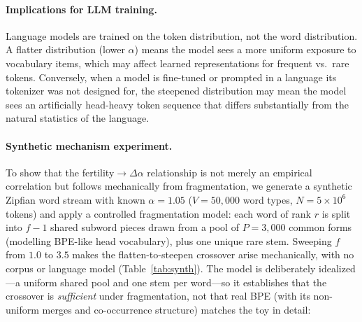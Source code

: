 \documentclass{article}
\begin{document}
\paragraph{Implications for LLM training.}
Language models are trained on the token distribution, not the word distribution. A
flatter distribution (lower $\alpha$) means the model sees a more uniform exposure to
vocabulary items, which may affect learned representations for frequent vs.\ rare tokens.
Conversely, when a model is fine-tuned or prompted in a language its tokenizer was not
designed for, the steepened distribution may mean the model sees an artificially
head-heavy token sequence that differs substantially from the natural statistics of
the language.

\paragraph{Synthetic mechanism experiment.}
To show that the fertility$\to\Delta\alpha$ relationship is not merely an empirical
correlation but follows mechanically from fragmentation, we generate a synthetic Zipfian
word stream with known $\alpha = 1.05$ ($V = 50{,}000$ word types, $N = 5 \times 10^6$
tokens) and apply a controlled fragmentation model: each word of rank $r$ is split into
$f-1$ shared subword pieces drawn from a pool of $P = 3{,}000$ common forms (modelling
BPE-like head vocabulary), plus one unique rare stem. Sweeping $f$ from $1.0$ to $3.5$
makes the flatten-to-steepen crossover arise mechanically, with no corpus or language
model (Table~\ref{tab:synth}). The model is deliberately idealized---a uniform shared
pool and one stem per word---so it establishes that the crossover is \emph{sufficient}
under fragmentation, not that real BPE (with its non-uniform merges and co-occurrence
structure) matches the toy in detail:
\end{document}
